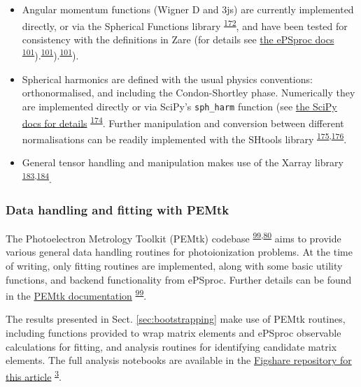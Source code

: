 \documentclass[10pt]{article}
\begin{document}
\begin{itemize}
\item Angular momentum functions (Wigner D and 3js) are currently implemented directly, or via the Spherical Functions library \textsuperscript{\hyperref[csl:172]{172}}, and have been tested for consistency with the definitions in Zare (for details see \href{https://epsproc.readthedocs.io/en/latest/tests/Spherical_function_testing_Aug_2019.html}{the ePSproc docs} \textsuperscript{\hyperref[csl:101]{101}}).\textsuperscript{\hyperref[csl:101]{101}}).\textsuperscript{\hyperref[csl:101]{101}}).
\item Spherical harmonics are defined with the usual physics conventions: orthonormalised, and including the Condon-Shortley phase. Numerically they are implemented directly or via SciPy's \verb+sph_harm+  function (see \href{https://docs.scipy.org/doc/scipy/reference/generated/scipy.special.sph_harm.html}{the SciPy docs for details} \textsuperscript{\hyperref[csl:174]{174}}. Further manipulation and conversion between different normalisations can be readily implemented with the SHtools library \textsuperscript{\hyperref[csl:175]{175},\hyperref[csl:176]{176}}.
\item General tensor handling and manipulation makes use of the Xarray library \textsuperscript{\hyperref[csl:183]{183},\hyperref[csl:184]{184}}.
\end{itemize}


\subsubsection{Data handling and fitting with PEMtk}

The Photoelectron Metrology Toolkit (PEMtk) codebase \textsuperscript{\hyperref[csl:99]{99},\hyperref[csl:80]{80}} aims to provide various general data handling routines for photoionization problems. At the time of writing, only fitting routines are implemented, along with some basic utility functions, and backend functionality from ePSproc. Further details can be found in the \href{https://pemtk.readthedocs.io/en/latest/about.html}{PEMtk documentation} \textsuperscript{\hyperref[csl:99]{99}}.

The results presented in Sect. \ref{sec:bootstrapping} make use of PEMtk routines, including functions provided to wrap matrix elements and ePSproc observable calculations for fitting, and analysis routines for identifying candidate matrix elements. The full analysis notebooks are available in the \href{http://dx.doi.org/10.6084/m9.figshare.20293782}{Figshare repository for this article} \textsuperscript{\hyperref[csl:3]{3}}.
\end{document}
